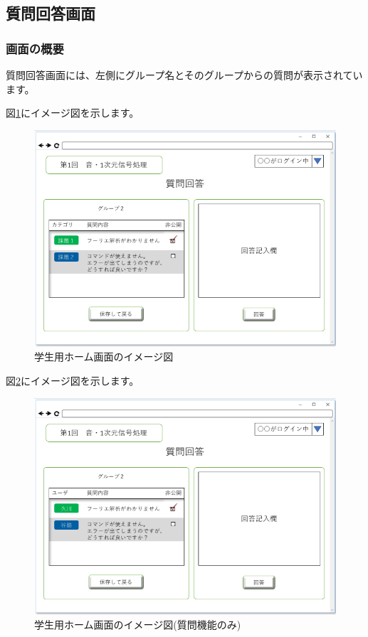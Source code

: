 \newpage

\subsection{質問回答画面}
\subsubsection{画面の概要}
質問回答画面には、左側にグループ名とそのグループからの質問が表示されています。

図\ref{fig:24}にイメージ図を示します。

\begin{figure}[htbp]
\begin{center}
  \includegraphics[width=1\linewidth,clip]{./img/24.png}
  \caption{学生用ホーム画面のイメージ図}\label{fig:24}
\end{center}
\end{figure}

図\ref{fig:25}にイメージ図を示します。

\begin{figure}[htbp]
\begin{center}
  \includegraphics[width=1\linewidth,clip]{./img/25.png}
  \caption{学生用ホーム画面のイメージ図(質問機能のみ)}\label{fig:25}
\end{center}
\end{figure}

